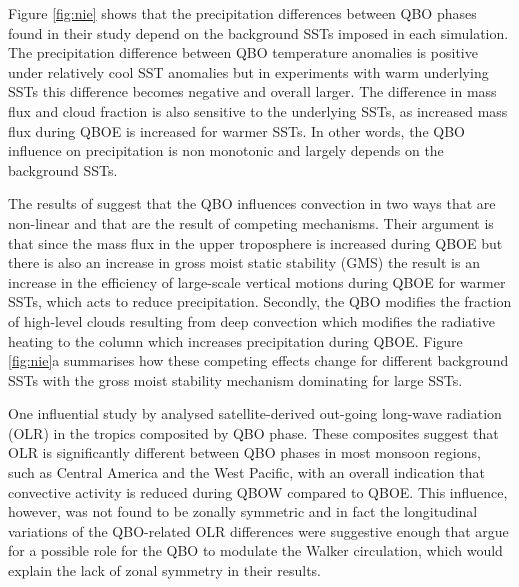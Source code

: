  Figure \ref{fig:nie} shows that the precipitation differences between QBO phases found in their study depend on the background SSTs imposed in each simulation.   The precipitation difference between QBO temperature anomalies is positive under relatively cool SST anomalies but in experiments with warm underlying SSTs this difference becomes negative and overall larger. The difference in mass flux and cloud fraction is also sensitive to the underlying SSTs, as increased mass flux during QBOE is increased for warmer SSTs.  In other words, the QBO influence on precipitation is non monotonic and largely depends on the background SSTs.
 
  The results of \cite{nie2015} suggest that the QBO influences convection in two ways that are non-linear and that are the result of competing mechanisms. Their argument is that since  the mass flux in the upper troposphere is increased during QBOE but there is also an increase in gross moist static stability (GMS) the result is an increase in the efficiency of large-scale vertical motions during QBOE for warmer SSTs, which acts to reduce precipitation.  Secondly, the QBO modifies the fraction of high-level clouds resulting from deep convection which modifies the radiative heating to the column which increases precipitation during QBOE.  Figure \ref{fig:nie}a summarises how these competing effects change for different background SSTs with the gross moist stability mechanism dominating for large SSTs. 

One influential study by \cite{collimore2003} analysed satellite-derived out-going long-wave radiation (OLR) in the tropics composited by QBO phase. These composites suggest that OLR is significantly different between QBO phases in most monsoon regions, such as Central America  and the West Pacific, with an overall indication that convective activity is reduced during QBOW compared to QBOE. This influence, however, was not found to be zonally symmetric and in fact the longitudinal variations of the QBO-related OLR differences were suggestive enough that \cite{collimore2003} argue for a possible role for the QBO to modulate the Walker circulation, which would explain the lack of zonal symmetry in their results. 

